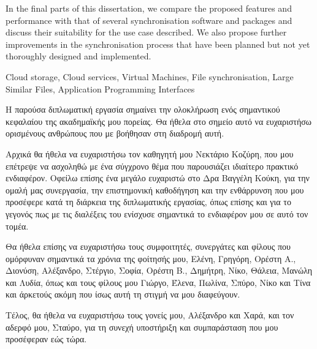 \begin{abstracten}
  In the final parts of this dissertation, we compare the proposed features and performance with that of several synchronisation software and packages and discuss their suitability for the use case described. We also propose further improvements in the synchronisation process that have been planned but not yet thoroughly designed and implemented.

\begin{keywordsen}
    Cloud storage, Cloud services, Virtual Machines, File synchronisation, Large Similar Files, Application Programming Interfaces
\end{keywordsen}
\end{abstracten}


\begin{acknowledgementsgr}
  Η παρούσα διπλωματική εργασία σημαίνει την ολοκλήρωση ενός σημαντικού κεφαλαίου της ακαδημαϊκής μου πορείας. Θα ήθελα στο σημείο αυτό να ευχαριστήσω ορισμένους ανθρώπους που με βοήθησαν στη διαδρομή αυτή.

  Αρχικά θα ήθελα να ευχαριστήσω τον καθηγητή μου Νεκτάριο Κοζύρη, που μου επέτρεψε να ασχοληθώ με ένα σύγχρονο θέμα που παρουσιάζει ιδιαίτερο πρακτικό ενδιαφέρον. Οφείλω επίσης ένα μεγάλο ευχαριστώ στο Δρα Βαγγέλη Κούκη, για την ομαλή μας συνεργασία, την επιστημονική καθοδήγηση και την ενθάρρυνση που μου προσέφερε κατά τη διάρκεια της διπλωματικής εργασίας, όπως επίσης και για το γεγονός πως με τις διαλέξεις του ενίσχυσε σημαντικά το ενδιαφέρον μου σε αυτό τον τομέα.

  Θα ήθελα επίσης να ευχαριστήσω τους συμφοιτητές, συνεργάτες και φίλους που ομόρφυναν σημαντικά τα χρόνια της φοίτησής μου, Ελένη, Γρηγόρη, Ορέστη Α., Διονύση, Αλέξανδρο, Στέργιο, Σοφία, Ορέστη Β., Δημήτρη, Νίκο, Θάλεια, Μανώλη και Λυδία, όπως και τους φίλους μου Γιώργο, Έλενα, Πωλίνα, Σπύρο, Νίκο και Τίνα και άρκετούς ακόμη που ίσως αυτή τη στιγμή να μου διαφεύγουν.

  Τέλος, θα ήθελα να ευχαριστήσω τους γονείς μου, Αλέξανδρο και Χαρά, και τον αδερφό μου, Σταύρο, για τη συνεχή υποστήριξη και συμπαράσταση που μου προσέφεραν εώς τώρα.
\end{acknowledgementsgr}
\singlespacing